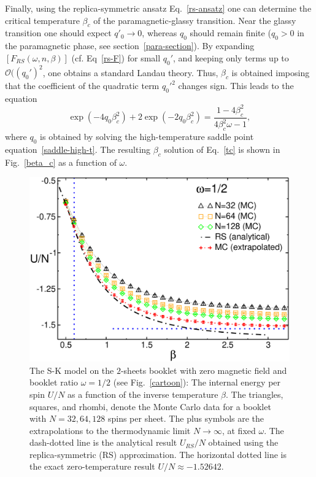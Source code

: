 \documentclass[twocolumn,superscriptaddress,prb,10pt]{revtex4-1}
\begin{document}
Finally, using the replica-symmetric ansatz Eq.~\eqref{rs-ansatz} one can determine 
the critical temperature $\beta_c$ of the paramagnetic-glassy transition. 
Near the glassy transition one should expect $q'_0\to0$, whereas $q_0$ 
should remain finite ($q_0>0$ in the paramagnetic phase, see section~\ref{para-section}). 
By expanding $[F_{RS}(\omega,n,\beta)]$ (cf. Eq~\eqref{rs-F}) for small $q_0'$, and 
keeping only terms up to ${\mathcal O}((q_0')^2$, one obtains a standard Landau theory. 
Thus, $\beta_c$ is obtained imposing that the coefficient of the quadratic term $q_0'^2$ 
changes sign. This leads to the equation 
%
\begin{equation}
\exp(-4q_0\beta^2_c)+2\exp(-2q_0\beta^2_c)=\frac{1-4\beta^2_c}
{4\beta^2_c\omega-1},
\label{tc}
\end{equation}
%
where $q_0$ is obtained by solving the high-temperature saddle point 
equation~\eqref{saddle-high-t}. The resulting $\beta_c$ solution of Eq.~\eqref{tc} 
is shown in Fig.~\ref{beta_c} as a function of $\omega$. 

\begin{figure}[t]
\includegraphics*[width=0.93\linewidth]{./draft_figs/U_w05}
\caption{
 The S-K model on the $2$-sheets booklet with zero magnetic field and 
 booklet ratio $\omega=1/2$ (see Fig.~\ref{cartoon}): The internal energy 
 per spin $U/N$ as a function of the inverse temperature $\beta$. The triangles, 
 squares, and rhombi, denote the Monte Carlo data for a booklet with 
 $N=32,64,128$ spins per sheet. The plus symbols are the extrapolations to the 
 thermodynamic limit $N\to\infty$, at fixed $\omega$. The dash-dotted line is the 
 analytical result $U_{RS}/N$ obtained using the replica-symmetric (RS) approximation. 
 The horizontal dotted line is the exact zero-temperature result $U/N\approx-1.52642$.
}
\label{U-MC}
\end{figure}
\end{document}
